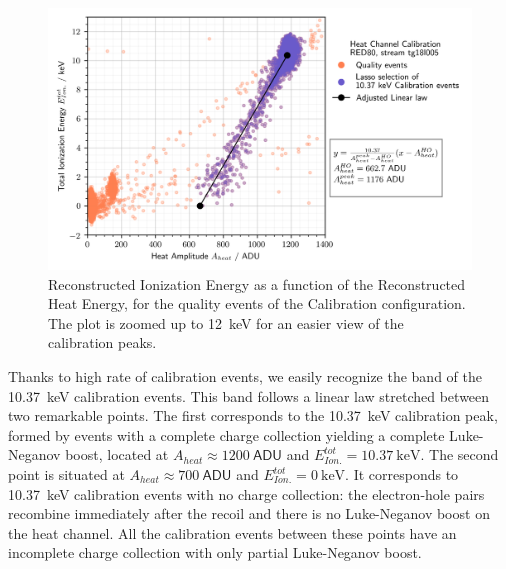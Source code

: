 \begin{figure}
\centering
\includegraphics[width=\linewidth,]{Figures/ElectrodesExperimental/heat_calibration.png}
\caption{Reconstructed Ionization Energy as a function of the Reconstructed Heat Energy, for the quality events of the Calibration configuration. The plot is zoomed up to \SI{12}{\kilo\eV} for an easier view of the calibration peaks. }
\label{fig:heat-calibration}
\end{figure}

Thanks to high rate of calibration events, we easily recognize the band of the \SI{10.37}{\kilo\eV} calibration events. This band follows a linear law stretched between two remarkable points. The first corresponds to the \SI{10.37}{\kilo\eV} calibration peak, formed by events with a complete charge collection yielding a complete Luke-Neganov boost, located at $A_{heat}\approx \SI{1200}{\textsf{ADU}}$ and $E_{Ion.}^{tot} = \SI{10.37}{\kilo\eV}$. The second point is situated at $A_{heat}\approx \SI{700}{\textsf{ADU}}$ and $E_{Ion.}^{tot} = \SI{0}{\kilo\eV}$. It corresponds to \SI{10.37}{\kilo\eV} calibration events with no charge collection: the electron-hole pairs recombine immediately after the recoil and there is no Luke-Neganov boost on the heat channel. All the calibration events between these points have an incomplete charge collection with only partial Luke-Neganov boost.

